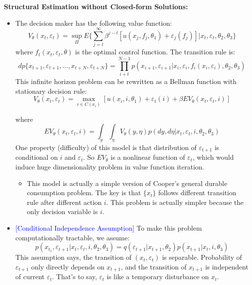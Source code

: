 \documentclass{book}
\theoremstyle{plain}
\theoremstyle{definition}
\begin{document}
\vspace{1em}
\noindent
\textbf{Structural Estimation without Closed-form Solutions:}
\begin{itemize}
	\item The decision maker has the following value function:
	\[V_\theta(x_t,\varepsilon_t)=
	\sup_\Pi E\Big\{
	\sum_{j=t}^{\infty} \beta^{j-t}[u(x_j,f_j,\theta_1)
	+\varepsilon_j(f_j)] | x_t,\varepsilon_t,\theta_2,\theta_3
	\Big\}\]
	where $f_t(x_t,\varepsilon_t,\theta)$ is the optimal control function. The transition rule is:
	\[dp\{x_{t+1},\varepsilon_{t+1},\dots,
	x_{t+N},\varepsilon_{t+N}\}
	=\prod_{i+t}^{N-1}p(x_{i+1},\varepsilon_{i+1}
	| x_i,\varepsilon_i,f_i(x_i,\varepsilon_i),\theta_2,\theta_3)\]
	This infinite horizon problem can be rewritten as a Bellman function with stationary decision rule:
	\[V_\theta(x_t,\varepsilon_t)=
	\max_{i \in C(x_i)}
	[u(x_i,i,\theta_1)+\varepsilon_t(i)+\beta
	E V_\theta(x_t,\varepsilon_t,i)]\]

	where
	\[EV_\theta(x_t,\varepsilon_t,i)=
	\int_y \int_\eta V_\theta(y,\eta)
	p(dy,d \eta|x_t,\varepsilon_t,i,\theta_2,\theta_3)\]
	One property (difficulty) of this model is that distribution of $\varepsilon_{t+1}$ is conditional on $i$ and $\varepsilon_t$. So $EV_\theta$ is a nonlinear function of $\varepsilon_t$, which would induce huge dimensionality problem in value function iteration.
	\begin{itemize}
		\item This model is actually a simple version of Cooper's general durable consumption problem. The key is that $\{x_t\}$ follows different transition rule after different action $i$. This problem is actually simpler because the only decision variable is $i$.
	\end{itemize}

	\item \textcolor{blue}{[Conditional Independence Assumption]}
	To make this problem computationally tractable, we assume:
	\[p(x_{t_1},\varepsilon_{t+1}|x_t,\varepsilon_t,i,\theta_2,\theta_3)=
	q(\varepsilon_{t+1}|x_{t+1},\theta_2)p(x_{t+1}|x_t,i,\theta_3)
	\]
	This assumption says, the transition of $(x_t,\varepsilon_t)$ is separable. Probability of $\varepsilon_{t+1}$ only directly depends on $x_{t+1}$, and the transition of $x_{t+1}$ is independent of current $\varepsilon_t$.
	That's to say, $\varepsilon_t$ is like a temporary disturbance on $x_t$.


\end{itemize}
\end{document}
